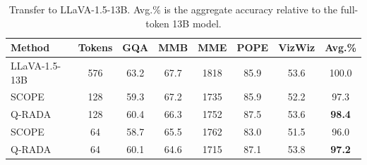\begin{table}[t]
\centering
\scriptsize
\setlength{\tabcolsep}{4.1pt}
\caption{Transfer to LLaVA-1.5-13B. Avg.\% is the aggregate accuracy relative
to the full-token 13B model.}
\label{tab:larger-model}
\begin{tabular}{lccccccc}
\toprule
Method & Tokens & GQA & MMB & MME & POPE & VizWiz & Avg.\% \\
\midrule
LLaVA-1.5-13B & 576 & 63.2 & 67.7 & 1818 & 85.9 & 53.6 & 100.0 \\
\midrule
SCOPE & 128 & 59.3 & 67.2 & 1735 & 85.9 & 52.2 & 97.3 \\
\rowcolor{gray!20} Q-RADA & 128 & 60.4 & 66.3 & 1752 & 87.5 & 53.6 & \textbf{98.4} \\
\midrule
SCOPE & 64 & 58.7 & 65.5 & 1762 & 83.0 & 51.5 & 96.0 \\
\rowcolor{gray!20} Q-RADA & 64 & 60.1 & 64.6 & 1715 & 87.1 & 53.8 & \textbf{97.2} \\
\bottomrule
\end{tabular}
\end{table}

